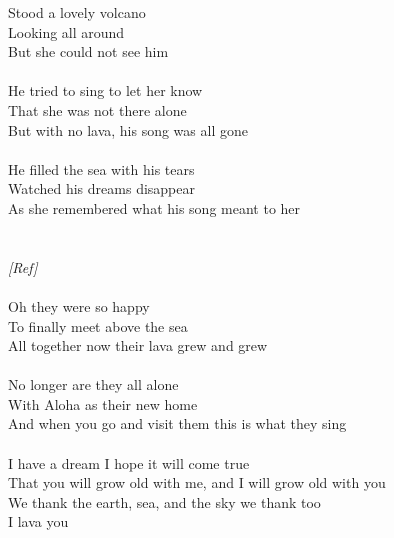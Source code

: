 {Stood a lovely volcano\\
Looking all around\\
But she could not see him\\
\\
He tried to sing to let her know\\
That she was not there alone\\
But with no lava, his song was all gone\\
\\
He filled the sea with his tears\\
Watched his dreams disappear\\
As she remembered what his song meant to her\\
\\
\\
\emph{[Ref]}\\
\\
Oh they were so happy\\
To finally meet above the sea\\
All together now their lava grew and grew\\
\\
No longer are they all alone\\
With Aloha as their new home\\
And when you go and visit them this is what they sing\\
\\
I have a dream I hope it will come true\\
That you will grow old with me, and I will grow old with you\\
We thank the earth, sea, and the sky we thank too\\
I lava you
}


